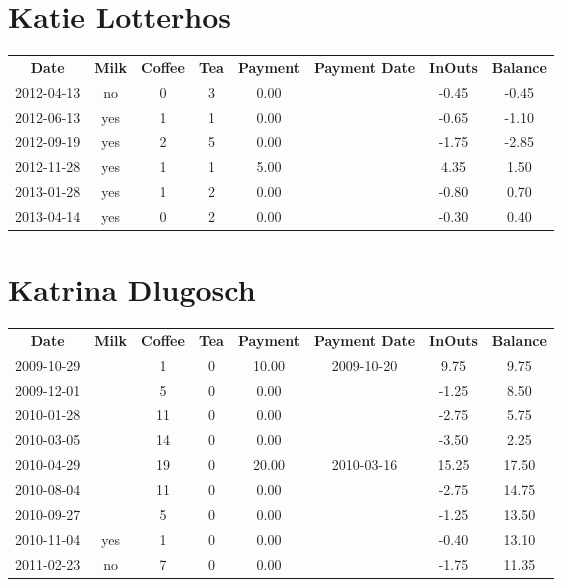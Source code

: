 \section{Katie Lotterhos}

\begin{center}
\begin{tabular}{cccccccc}
\textbf{Date} & \textbf{Milk} & \textbf{Coffee} & \textbf{Tea} & \textbf{Payment} & \textbf{Payment Date} & \textbf{InOuts} & \textbf{Balance} \\
2012-04-13 & no & 0 & 3 & 0.00 &  & -0.45 & -0.45\\ 
2012-06-13 & yes & 1 & 1 & 0.00 &  & -0.65 & -1.10\\ 
2012-09-19 & yes & 2 & 5 & 0.00 &  & -1.75 & -2.85\\ 
2012-11-28 & yes & 1 & 1 & 5.00 &  &  4.35 &  1.50\\ 
2013-01-28 & yes & 1 & 2 & 0.00 &  & -0.80 &  0.70\\ 
2013-04-14 & yes & 0 & 2 & 0.00 &  & -0.30 &  0.40
\end{tabular}
\end{center}

\section{Katrina Dlugosch}

\begin{center}
\begin{tabular}{cccccccc}
\textbf{Date} & \textbf{Milk} & \textbf{Coffee} & \textbf{Tea} & \textbf{Payment} & \textbf{Payment Date} & \textbf{InOuts} & \textbf{Balance} \\
2009-10-29 &  &  1 & 0 & 10.00 & 2009-10-20 &  9.75 &  9.75\\ 
2009-12-01 &  &  5 & 0 &  0.00 &  & -1.25 &  8.50\\ 
2010-01-28 &  & 11 & 0 &  0.00 &  & -2.75 &  5.75\\ 
2010-03-05 &  & 14 & 0 &  0.00 &  & -3.50 &  2.25\\ 
2010-04-29 &  & 19 & 0 & 20.00 & 2010-03-16 & 15.25 & 17.50\\ 
2010-08-04 &  & 11 & 0 &  0.00 &  & -2.75 & 14.75\\ 
2010-09-27 &  &  5 & 0 &  0.00 &  & -1.25 & 13.50\\ 
2010-11-04 & yes &  1 & 0 &  0.00 &  & -0.40 & 13.10\\ 
2011-02-23 & no &  7 & 0 &  0.00 &  & -1.75 & 11.35
\end{tabular}
\end{center}

